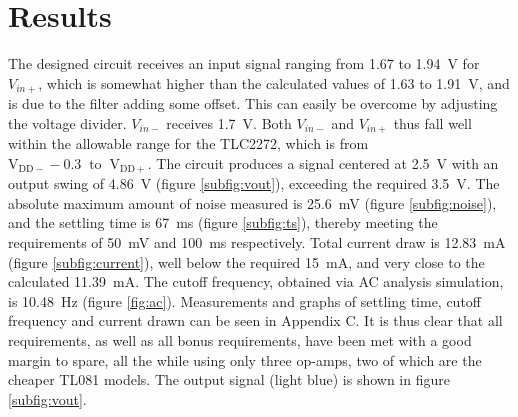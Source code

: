 \section{Results} \label{sec:temp_results}
The designed circuit receives an input signal ranging from 1.67 to \SI{1.94}{\volt} for $V_{in+}$, which is somewhat higher than the calculated values of 1.63 to \SI{1.91}{\volt}, and is due to the filter adding some offset. This can easily be overcome by adjusting the voltage divider. $V_{in-}$ receives \SI{1.7}{\volt}. Both $V_{in-}$ and $V_{in+}$ thus fall well within the allowable range for the TLC2272, which is from $\mathrm{V}_{\mathrm{DD}-}-0.3 \;\; \mathrm{to} \;\; \mathrm{V}_{\mathrm{DD}+}$\cite{tlc}.  The circuit produces a signal centered at \SI{2.5}{\volt} with an output swing of \SI{4.86}{\volt} (figure \ref{subfig:vout}), exceeding the required \SI{3.5}{\volt}. The absolute maximum amount of noise measured is \SI{25.6}{\milli\volt} (figure \ref{subfig:noise}), and the settling time is \SI{67}{ms} (figure \ref{subfig:ts}), thereby meeting the requirements of \SI{50}{\milli\volt} and \SI{100}{ms} respectively. Total current draw is \SI{12.83}{mA} (figure \ref{subfig:current}), well below the required \SI{15}{mA}, and very close to the calculated \SI{11.39}{mA}. The cutoff frequency, obtained via AC analysis simulation, is \SI{10.48}{Hz} (figure \ref{fig:ac}). Measurements and graphs of settling time, cutoff frequency and current drawn can be seen in Appendix C. It is thus clear that all requirements, as well as all bonus requirements, have been met with a good margin to spare, all the while using only three op-amps, two of which are the cheaper TL081 models. The output signal (light blue) is shown in figure \ref{subfig:vout}.

